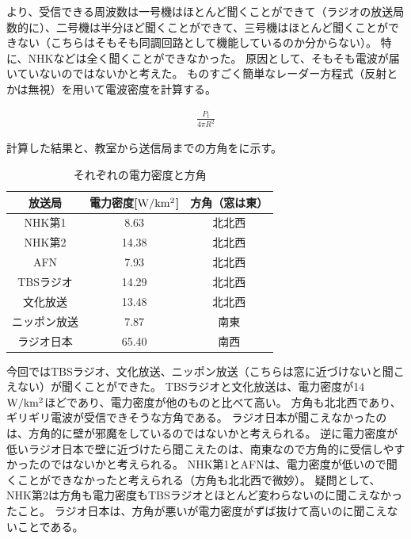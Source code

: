 \documentclass[report.tex]{subfiles}
\begin{document}
より、受信できる周波数は一号機はほとんど聞くことができて（ラジオの放送局数的に）、二号機は半分ほど聞くことができて、三号機はほとんど聞くことができない（こちらはそもそも同調回路として機能しているのか分からない）。
特に、NHKなどは全く聞くことができなかった。
原因として、そもそも電波が届いていないのではないかと考えた。
ものすごく簡単なレーダー方程式（反射とかは無視）を用いて電波密度を計算する。

\begin{align}
	\frac{P_t}{4 \pi R^2} \label{eq:radar}
\end{align}

計算した結果と、教室から送信局までの方角をに示す。

\begin{table}[H]
	\centering
	\caption{それぞれの電力密度と方角}
	\label{tab:aaa}
	\begin{tabular}{ccc} \hline
		放送局    & 電力密度[\(\rm{W/km^2}\)] & 方角（窓は東） \\ \hline
		NHK第1  & 8.63                  & 北北西     \\
		NHK第2  & 14.38                 & 北北西     \\
		AFN    & 7.93                  & 北北西     \\
		TBSラジオ & 14.29                 & 北北西     \\
		文化放送   & 13.48                 & 北北西     \\
		ニッポン放送 & 7.87                  & 南東      \\
		ラジオ日本  & 65.40                 & 南西      \\ \hline
	\end{tabular}
\end{table}

今回ではTBSラジオ、文化放送、ニッポン放送（こちらは窓に近づけないと聞こえない）が聞くことができた。
TBSラジオと文化放送は、電力密度が14 \(\rm{W/km^2}\)ほどであり、電力密度が他のものと比べて高い。
方角も北北西であり、ギリギリ電波が受信できそうな方角である。
ラジオ日本が聞こえなかったのは、方角的に壁が邪魔をしているのではないかと考えられる。
逆に電力密度が低いラジオ日本で壁に近づけたら聞こえたのは、南東なので方角的に受信しやすかったのではないかと考えられる。
NHK第1とAFNは、電力密度が低いので聞くことができなかったと考えられる（方角も北北西で微妙）。
疑問として、NHK第2は方角も電力密度もTBSラジオとほとんど変わらないのに聞こえなかったこと。
ラジオ日本は、方角が悪いが電力密度がずば抜けて高いのに聞こえないことである。
\end{document}
